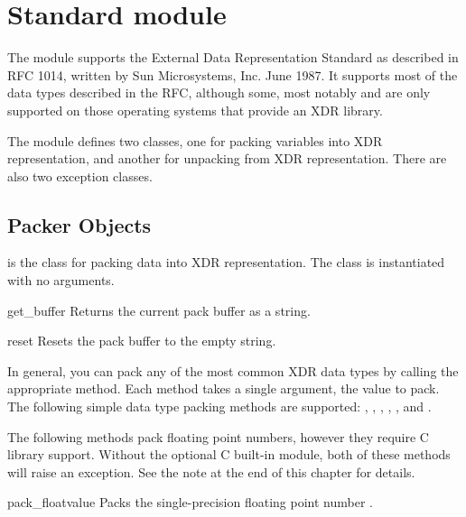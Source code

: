 \section{Standard module }

\renewcommand{\indexsubitem}{(in module xdrlib)}


The  module supports the External Data Representation
Standard as described in RFC 1014, written by Sun Microsystems,
Inc. June 1987.  It supports most of the data types described in the
RFC, although some, most notably  and  are
only supported on those operating systems that provide an XDR
library.

The  module defines two classes, one for packing
variables into XDR representation, and another for unpacking from XDR
representation.  There are also two exception classes.


\subsection{Packer Objects}

 is the class for packing data into XDR representation.
The  class is instantiated with no arguments.

\begin{funcdesc}{get_buffer}{}
Returns the current pack buffer as a string.
\end{funcdesc}

\begin{funcdesc}{reset}{}
Resets the pack buffer to the empty string.
\end{funcdesc}

In general, you can pack any of the most common XDR data types by
calling the appropriate  method.  Each method
takes a single argument, the value to pack.  The following simple data
type packing methods are supported: , ,
, , ,
and .

The following methods pack floating point numbers, however they
require C library support.  Without the optional C built-in module,
both of these methods will raise an 
exception.  See the note at the end of this chapter for details.

\begin{funcdesc}{pack_float}{value}
Packs the single-precision floating point number .
\end{funcdesc}

